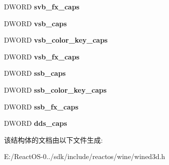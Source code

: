 \begin{DoxyCompactItemize}
D\+W\+O\+RD {\bfseries svb\+\_\+fx\+\_\+caps}
\item 
\mbox{\label{structwined3d__ddraw__caps_a3b1a71a506b5c2777d07bb35c2a29b98}} 
D\+W\+O\+RD {\bfseries vsb\+\_\+caps}
\item 
\mbox{\label{structwined3d__ddraw__caps_a606dc1a94f2e9636c0d720c2a2e91841}} 
D\+W\+O\+RD {\bfseries vsb\+\_\+color\+\_\+key\+\_\+caps}
\item 
\mbox{\label{structwined3d__ddraw__caps_a0d36591a1a5ef113e42eab0a5991c460}} 
D\+W\+O\+RD {\bfseries vsb\+\_\+fx\+\_\+caps}
\item 
\mbox{\label{structwined3d__ddraw__caps_a4f7ba2b5895b54e9630c97f3deeb2548}} 
D\+W\+O\+RD {\bfseries ssb\+\_\+caps}
\item 
\mbox{\label{structwined3d__ddraw__caps_a10ac90a3d3a987fecf7e5214a907ac21}} 
D\+W\+O\+RD {\bfseries ssb\+\_\+color\+\_\+key\+\_\+caps}
\item 
\mbox{\label{structwined3d__ddraw__caps_a534ec344b70fd9ab4b1b318bad3185b5}} 
D\+W\+O\+RD {\bfseries ssb\+\_\+fx\+\_\+caps}
\item 
\mbox{\label{structwined3d__ddraw__caps_ab5fd39ea65a124145f9ccdd1f29e0709}} 
D\+W\+O\+RD {\bfseries dds\+\_\+caps}
\end{DoxyCompactItemize}


该结构体的文档由以下文件生成\+:\begin{DoxyCompactItemize}
\item 
E\+:/\+React\+O\+S-\/0../sdk/include/reactos/wine/wined3d.\+h\end{DoxyCompactItemize}
